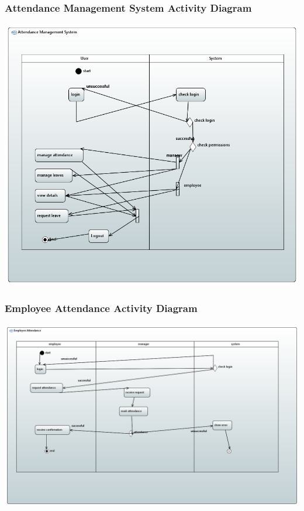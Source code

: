 \documentclass[a4paper, 12pt]{article}
\begin{document}
\subsubsection{Attendance Management System Activity Diagram}
\begin{center}
\includegraphics[width=1\textwidth]{Attendance_Management_System_Activity_Diagram.PNG}\par
\end{center}
\subsubsection{Employee Attendance Activity Diagram}
\begin{center}
\includegraphics[width=1\textwidth]{Employee_Attendance_Activity_Diagram.PNG}\par
\end{center}
\end{document}
